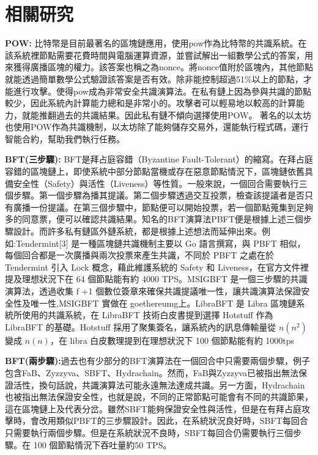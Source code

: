 \chapter{相關研究}\label{se_7}
{\bfseries POW:}
比特幣是目前最著名的區塊鏈應用，使用pow作為比特幣的共識系統。在該系統裡節點需要花費時間與電腦運算資源，並嘗試解出一組數學公式的答案，用來獲得廣播區塊的權力。該答案也稱之為nonce。將nonce值附於區塊內，其他節點就能透過簡單數學公式驗證該答案是否有效。除非能控制超過51\%以上的節點，才能進行攻擊。使得pow成為非常安全共識演算法。在私有鏈上因為參與共識的節點較少，因此系統內計算能力總和是非常小的。攻擊者可以輕易地以較高的計算能力，就能推翻過去的共識結果。因此私有鏈不傾向選擇使用POW。
著名的以太坊也使用POW作為共識機制，以太坊除了能夠儲存交易外，還能執行程式碼，運行智能合約，幫助我們執行任務。


{\bfseries BFT(三步驟):}
BFT是拜占庭容錯（Byzantine Fault-Tolerant）的縮寫。在拜占庭容錯的區塊鏈上，即使系統中部分節點當機或存在惡意節點情況下，區塊鏈依舊具備安全性（Safety）與活性（Liveness）等性質。一般來說，一個回合需要執行三個步驟。第一個步驟為播其提議。第二個步驟透過交互投票，檢查該提議者是否只有廣播一份提議。在第三個步驟中，節點便可以開始投票，若一個節點蒐集到足夠多的同意票，便可以確認共識結果。知名的BFT演算法PBFT\cite{castro1999practical}便是根據上述三個步驟設計。而許多私有鏈區外鏈系統，都是根據上述想法而延伸出來。例如:Tendermint[3] 是一種區塊鏈共識機制主要以 Go 語言撰寫，與 PBFT 相似，每個回合都是一次廣播與兩次投票來產生共識，不同於 PBFT 之處在於Tendermint 引入 Lock 概念，藉此維護系統的 Safety 和 Liveness，在官方文件裡提及理想狀況下在 64 個節點能有約 4000 TPS。MSIG­BFT 是一個三步驟的共識演算法，透過收集 f +1 個數位簽章來確保共識提議唯一性，讓共識演算法保證安全性及唯一性,MSIG­BFT 實做在 go­ethereumg上。LibraBFT\cite{STEVE_HANNA2010} 是 Libra 區塊鏈系統所使用的共識系統，在 LibraBFT 技術白皮書提到選擇 Hotstuff\cite{yin2018hotstuff} 作為 LibraBFT 的基礎。Hotstuff 採用了聚集簽名，讓系統內的訊息傳輸量從 $n(n^2)$ 變成 $n(n)$，在 libra 白皮數理提到在理想狀況下 100 個節點能有約 1000tps

{\bfseries BFT(兩步驟):}過去也有少部分的BFT演算法在一個回合中只需要兩個步驟，例子包含FaB\cite{abraham2018revisiting}、Zyzzyva\cite{kotla2007zyzzyva}、SBFT\cite{martin2006fast}、Hydrachain\cite{Hydrachain}。然而，FaB與Zyzzyva已被指出無法保證活性，換句話說，共識演算法可能永遠無法達成共識。另一方面，Hydrachain也被指出無法保證安全性，也就是說，不同的正常節點可能會有不同的共識節果，這在區塊鏈上及代表分岔。雖然SBFT能夠保證安全性與活性，但是在有拜占庭攻擊時，會改用類似PBFT的三步驟設計。因此，在系統狀況良好時，SBFT每回合只需要執行兩個步驟。但是在系統狀況不良時，SBFT每回合仍需要執行三個步驟。在 100 個節點情況下吞吐量約50 TPS。

